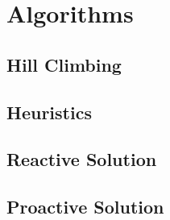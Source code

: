 \chapter{Algorithms}
\label{chp:algorithms}


\lipsum[1]



\section{Hill Climbing}
\label{sec:hill-climbing}
\lipsum[1]


\section{Heuristics}
\label{sec:heuristics}
\lipsum[1]


\section{Reactive Solution}
\label{sec:reactive-solution}
\lipsum[1]


\section{Proactive Solution}
\label{sec:proactive-solution}
\lipsum[1]